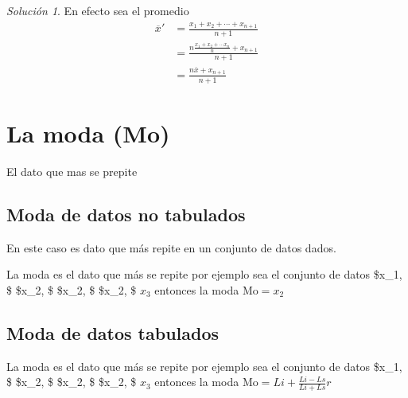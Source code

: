 \documentclass[
  10pt,
]{krantz}
\theoremstyle{definition}
\theoremstyle{definition}
\theoremstyle{definition}
\theoremstyle{definition}
\theoremstyle{remark}
\newtheorem*{solution}{Solución}
\begin{document}
\begin{solution}
{}En efecto sea el promedio
\begin{align*}
\overline{x}'&=\frac{x_1+x_2+\cdots+x_{n+1}}{n+1}\\
&=\frac{n\frac{x_1+x_2+\cdots x_n}{n}+x_{n+1}}{n+1}\\
&=\frac{n\overline{x}+x_{n+1}}{n+1}
\end{align*}
\end{solution}

\hypertarget{la-moda-mo}{%
\section{La moda (Mo)}\label{la-moda-mo}}

El dato que mas se prepite

\hypertarget{moda-de-datos-no-tabulados}{%
\subsection{Moda de datos no tabulados}\label{moda-de-datos-no-tabulados}}

En este caso es dato que más repite en un conjunto de datos dados.

La moda es el dato que más se repite por ejemplo sea el conjunto de datos \$x\_1, \$ \$x\_2, \$ \$x\_2, \$ \$x\_2, \$ \(x_3\) entonces la moda \(\text{Mo}=x_2\)

\hypertarget{moda-de-datos-tabulados}{%
\subsection{Moda de datos tabulados}\label{moda-de-datos-tabulados}}

La moda es el dato que más se repite por ejemplo sea el conjunto de datos \$x\_1, \$ \$x\_2, \$ \$x\_2, \$ \$x\_2, \$ \(x_3\) entonces la moda \(\text{Mo}=Li+\frac{Li-Ls}{Li+Ls}r\)
\end{document}
